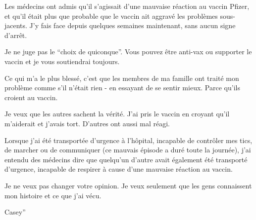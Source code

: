Les médecins ont admis qu'il s'agissait d'une mauvaise réaction au vaccin
Pfizer, et qu'il était plus que probable que le vaccin ait aggravé les problèmes
sous-jacents. J'y fais face depuis quelques semaines maintenant, sans aucun
signe d'arrêt.

Je ne juge pas le ``choix de quiconque''. Vous pouvez être anti-vax ou supporter
le vaccin et je vous soutiendrai toujours.

Ce qui m'a le plus blessé, c'est que les membres de ma famille ont traité mon
problème comme s'il n'était rien - en essayant de se sentir mieux. Parce qu'ils
croient au vaccin.

Je veux que les autres sachent la vérité. J'ai pris le vaccin en croyant qu'il
m'aiderait et j'avais tort. D'autres ont aussi mal réagi.

Lorsque j'ai été transportée d'urgence à l'hôpital, incapable de contrôler mes
tics, de marcher ou de communiquer (ce mauvais épisode a duré toute la journée),
j'ai entendu des médecins dire que quelqu'un d'autre avait également été
transporté d'urgence, incapable de respirer à cause d'une mauvaise réaction au
vaccin.

Je ne veux pas changer votre opinion. Je veux seulement que les gens connaissent
mon histoire et ce que j'ai vécu.

Casey''
